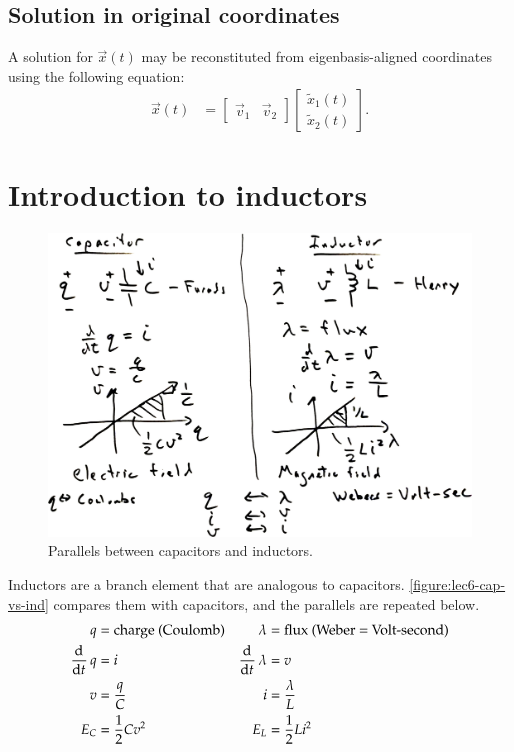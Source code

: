 \subsection{Solution in original coordinates}
A solution for \(\vec x(t)\) may be reconstituted from eigenbasis-aligned coordinates using the following equation:
\begin{align}
  \vec x(t)
  &= \begin{bmatrix}
    \vec v_1 & \vec v_2
\end{bmatrix}
\begin{bmatrix}
  \tilde x_1 (t) \\
  \tilde x_2 (t)
\end{bmatrix}.
\end{align}

\section{Introduction to inductors}
\begin{figure}
  \centering
  \includegraphics[width=1\linewidth]{figures/6/cap-vs-ind}
  \caption{Parallels between capacitors and inductors.}
  \label{figure:lec6-cap-vs-ind}
\end{figure}
Inductors are a branch element that are analogous to capacitors.
\autoref{figure:lec6-cap-vs-ind} compares them with capacitors,
and the parallels are repeated below.
\begin{align}
  q &= \text{charge (Coulomb)}
  & \lambda &= \text{flux (Weber = Volt-second)}\\
  \dod{}{t} q &= i & \dod{}{t} \lambda &= v\\
  v &= \frac{q}{C} & i &= \frac{\lambda}{L} \\
  E_{C} &= \frac{1}{2} Cv^2 & E_{L} &= \frac{1}{2} Li^2
\end{align}

